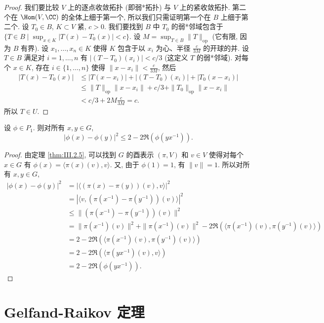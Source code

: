 \begin{proof}
我们要比较 $V$ 上的逐点收敛拓扑 (即弱*拓扑) 与 $V$ 上的紧收敛拓扑. 第二个在 $\Hom(V, \CC)$ 的全体上细于第一个, 所以我们只需证明第一个在 $B$ 上细于第二个.
设 $T_0 \in B$, $K \subset V$ 紧, $c > 0$. 我们要找到 $B$ 中 $T_0$ 的弱*邻域包含于 $\{T \in B \mid \sup_{x \in K}|T(x) - T_0(x)| < c\}$. 设 $M = \sup_{T \in B}\|T\|_{\mathrm{op}}$ (它有限, 因为 $B$ 有界). 设 $x_1, \ldots, x_n \in K$ 使得 $K$ 包含于以 $x_i$ 为心、半径 $\frac{c}{3M}$ 的开球的并. 设 $T \in B$ 满足对 $i = 1, \ldots, n$ 有 $|(T - T_0)(x_i)| < c/3$ (这定义 $T$ 的弱*邻域). 对每个 $x \in K$, 存在 $i \in \{1, \ldots, n\}$ 使得 $\|x - x_i\| < \frac{c}{3M}$, 然后
\begin{align*}
|T(x) - T_0(x)| &\leq |T(x - x_i)| + |(T - T_0)(x_i)| + |T_0(x - x_i)| \\
&\leq \|T\|_{\mathrm{op}}\|x - x_i\| + c/3 + \|T_0\|_{\mathrm{op}}\|x - x_i\| \\
&< c/3 + 2M\frac{c}{3M} = c.
\end{align*}
所以 $T \in U$.
\end{proof}

\begin{lemma}[正定型函数的一致连续估计]
\label{lem:III.4.7}
设 $\phi \in P_1$. 则对所有 $x, y \in G$,
\[
|\phi(x) - \phi(y)|^2 \leq 2 - 2\Re(\phi(yx^{-1})).
\]
\end{lemma}

\begin{proof}
由定理 \ref{thm:III.2.5}, 可以找到 $G$ 的酉表示 $(\pi, V)$ 和 $v \in V$ 使得对每个 $x \in G$ 有 $\phi(x) = \langle \pi(x)(v), v \rangle$. 又, 由于 $\phi(1) = 1$, 有 $\|v\| = 1$. 所以对所有 $x, y \in G$,
\begin{align*}
|\phi(x) - \phi(y)|^2 &= |\langle (\pi(x) - \pi(y))(v), v \rangle|^2 \\
&= |\langle v, (\pi(x^{-1}) - \pi(y^{-1}))(v) \rangle|^2 \\
&\leq \|(\pi(x^{-1}) - \pi(y^{-1}))(v)\|^2 \\
&= \|\pi(x^{-1})(v)\|^2 + \|\pi(x^{-1})(v)\|^2 - 2\Re(\langle \pi(x^{-1})(v), \pi(y^{-1})(v) \rangle) \\
&= 2 - 2\Re(\langle \pi(x^{-1})(v), \pi(y^{-1})(v) \rangle) \\
&= 2 - 2\Re(\langle \pi(yx^{-1})(v), v \rangle) \\
&= 2 - 2\Re(\phi(yx^{-1})).
\end{align*}
\end{proof}

\section{Gelfand-Raikov 定理}

